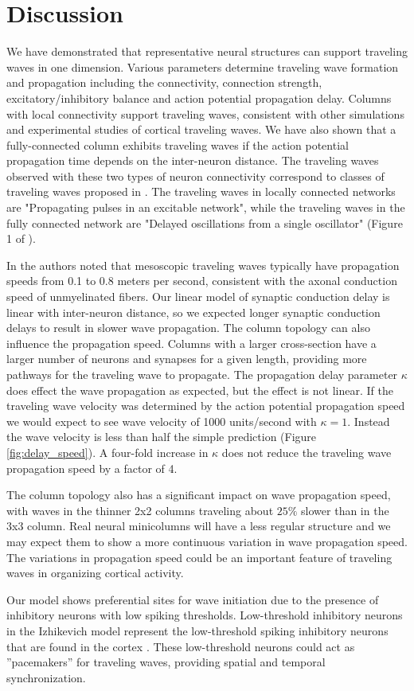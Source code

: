 \documentclass[a4paper,11pt]{article}
\begin{document}
\section{Discussion}
We have demonstrated that representative neural structures can support traveling waves in one dimension.
Various parameters determine traveling wave formation and propagation including the connectivity, connection strength, excitatory/inhibitory balance and action potential propagation delay.
Columns with local connectivity support traveling waves, consistent with other simulations and experimental studies of cortical traveling waves.
We have also shown that  a fully-connected column exhibits traveling waves if the action potential propagation time depends on the inter-neuron distance. 
The traveling waves observed with these two types of neuron connectivity correspond to classes of traveling waves proposed in \cite{ermentrout2001}.
The traveling waves in locally connected networks are "Propagating pulses in an excitable network", while the traveling waves in the fully connected network are "Delayed oscillations from a single oscillator" (Figure 1 of \cite{ermentrout2001}).

In \cite{muller2018} the authors noted that mesoscopic traveling waves typically have propagation speeds from 0.1 to 0.8 meters per second, consistent with the axonal conduction speed of unmyelinated fibers.
Our linear model of synaptic conduction delay is linear with inter-neuron distance, so we expected longer synaptic conduction delays to result in slower wave propagation.
The column topology can also influence the propagation speed.
Columns with a larger cross-section have a larger number of neurons and synapses for a given length, providing more pathways for the traveling wave to propagate.
The propagation delay parameter $\kappa$ does effect the wave propagation as expected, but the effect is not linear.
If the traveling wave velocity was determined by the action potential propagation speed we would expect to see wave velocity of 1000 units/second with $\kappa=1$.
Instead the wave velocity is less than half the simple prediction (Figure \ref{fig:delay_speed}).
A four-fold increase in $\kappa$ does not reduce the traveling wave propagation speed by a factor of 4. 

The column topology also has a significant impact on wave propagation speed, with waves in the thinner 2x2 columns traveling about $25\%$ slower than in the 3x3 column.
Real neural minicolumns will have a less regular structure and we may expect them to show a more continuous variation in wave propagation speed. 
The variations in propagation speed could be an important feature of traveling waves in organizing cortical activity.

Our model shows preferential sites for wave initiation due to the presence of inhibitory neurons with low spiking thresholds.
Low-threshold inhibitory neurons in the Izhikevich model represent the low-threshold spiking inhibitory neurons that are found in the cortex \cite{izhikevich2003}\cite{gibson2009}.
These low-threshold neurons could act as ''pacemakers'' for traveling waves, providing spatial and temporal synchronization.

\clearpage
\printbibliography
\end{document}
